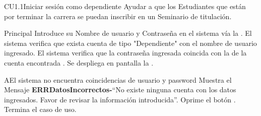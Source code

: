 
% 



	\begin{UseCase}{CU1.1}{Iniciar sesión como dependiente}{
		Ayudar a que los Estudiantes que están por terminar la carrera se puedan inscribir en un Seminario de titulación.
	}
	\end{UseCase}

	\begin{UCtrayectoria}{Principal}
		\UCpaso[\UCactor] Introduce su Nombre de usuario y Contraseña en el sistema vía la  \label{CU1_1Login}.
		\UCpaso El sistema verifica que exista cuenta de tipo "Dependiente" con el nombre de usuario ingresado.
		\UCpaso El sistema verifica que la contraseña ingresada coincida con la de la cuenta encontrada .
		\UCpaso Se despliega en pantalla la .	
	\end{UCtrayectoria}
		
		\begin{UCtrayectoriaA}{A}{El sistema no encuentra coincidencias de usuario y password}
			\UCpaso Muestra el Mensaje {\bf ERRDatosIncorrectos-}``No existe ninguna cuenta con los datos ingresados. Favor de revisar la informaci\'on introducida''.
			\UCpaso[\UCactor] Oprime el botón .
			\UCpaso[] Termina el caso de uso.
		\end{UCtrayectoriaA}
		
		
